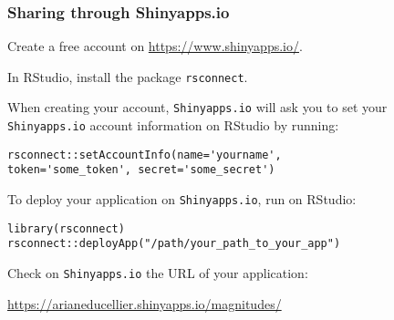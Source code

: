 \documentclass{beamer}
\begin{document}
	\begin{frame}[fragile]
		\frametitle{Sharing through Shinyapps.io}

		Create a free account on \href{https://www.shinyapps.io/}{https://www.shinyapps.io/}.

		\vspace{1em}

		In RStudio, install the package \verb|rsconnect|.

		\vspace{1em}

		When creating your account, \verb|Shinyapps.io| will ask you to set your \verb|Shinyapps.io| account information on RStudio by running:
		
		\begin{exampleblock}{}
		\begin{BVerbatim}
rsconnect::setAccountInfo(name='yourname',
token='some_token', secret='some_secret')
		\end{BVerbatim}
		\end{exampleblock}{}

		To deploy your application on \verb|Shinyapps.io|, run on RStudio:

		\begin{exampleblock}{}
		\begin{BVerbatim}
library(rsconnect)
rsconnect::deployApp("/path/your_path_to_your_app")
		\end{BVerbatim}
		\end{exampleblock}{}

		Check on \verb|Shinyapps.io| the URL of your application:

		\href{https://arianeducellier.shinyapps.io/magnitudes/}{https://arianeducellier.shinyapps.io/magnitudes/}

	\end{frame}
\end{document}
